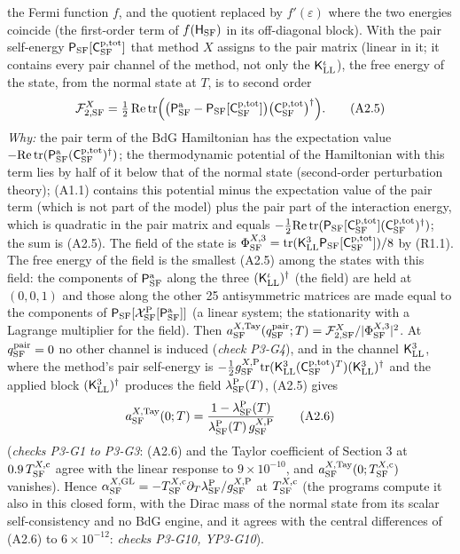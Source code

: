 \documentclass[
  10pt,
]{article}
\begin{document}
the Fermi function \(f\), and the quotient replaced by
\(f'(\varepsilon)\) where the two energies coincide (the first-order
term of \(f(\mathsf H_{\rm SF})\) in its off-diagonal block). With the
pair self-energy \(\mathsf P_{\rm SF}[\mathsf C^{\rm p,tot}_{\rm SF}]\)
that method \(X\) assigns to the pair matrix (linear in it; it contains
every pair channel of the method, not only the
\(\mathsf K^\iota_{\rm LL}\)), the free energy of the state, from the
normal state at \(T\), is to second order
\[\mathcal F^X_{2,{\rm SF}}=\tfrac12\,\mathrm{Re}\,\mathrm{tr}\Big(\big(\mathsf P^{\rm a}_{\rm SF}-\mathsf P_{\rm SF}[\mathsf C^{\rm p,tot}_{\rm SF}]\big)\big(\mathsf C^{\rm p,tot}_{\rm SF}\big)^\dagger\Big).\tag{A2.5}\]
\emph{Why:} the pair term of the BdG Hamiltonian has the expectation
value
\(-\mathrm{Re}\,\mathrm{tr}(\mathsf P^{\rm a}_{\rm SF}(\mathsf C^{\rm p,tot}_{\rm SF})^\dagger)\);
the thermodynamic potential of the Hamiltonian with this term lies by
half of it below that of the normal state (second-order perturbation
theory); (A1.1) contains this potential minus the expectation value of
the pair term (which is not part of the model) plus the pair part of the
interaction energy, which is quadratic in the pair matrix and equals
\(-\tfrac12\mathrm{Re}\,\mathrm{tr}(\mathsf P_{\rm SF}[\mathsf C^{\rm p,tot}_{\rm SF}](\mathsf C^{\rm p,tot}_{\rm SF})^\dagger)\);
the sum is (A2.5). The field of the state is
\(\Phi^{X,3}_{\rm SF}=\mathrm{tr}(\mathsf K^3_{\rm LL}\mathsf P_{\rm SF}[\mathsf C^{\rm p,tot}_{\rm SF}])/8\)
by (R1.1). The free energy of the field is the smallest (A2.5) among the
states with this field: the components of \(\mathsf P^{\rm a}_{\rm SF}\)
along the three \((\mathsf K^\iota_{\rm LL})^\dagger\) (the field) are
held at \((0,0,1)\) and those along the other 25 antisymmetric matrices
are made equal to the components of
\(\mathsf P_{\rm SF}[\mathcal X^{\rm P}_{\rm SF}[\mathsf P^{\rm a}_{\rm SF}]]\)
(a linear system; the stationarity with a Lagrange multiplier for the
field). Then
\(a^{X,{\rm Tay}}_{\rm SF}(q^{\rm pair}_{\rm SF};T)=\mathcal F^X_{2,{\rm SF}}/\lvert\Phi^{X,3}_{\rm SF}\rvert^2\).
At \(q^{\rm pair}_{\rm SF}=0\) no other channel is induced (\emph{check
P3-G4}), and in the channel \(\mathsf K^3_{\rm LL}\), where the method's
pair self-energy is
\(-\tfrac12g^{X,{\rm P}}_{\rm SF}\mathrm{tr}(\mathsf K^3_{\rm LL}(\mathsf C^{\rm p,tot}_{\rm SF})^T)(\mathsf K^3_{\rm LL})^\dagger\)
and the applied block \((\mathsf K^3_{\rm LL})^\dagger\) produces the
field \(\lambda^{\rm P}_{\rm SF}(T)\), (A2.5) gives
\[a^{X,{\rm Tay}}_{\rm SF}(0;T)=\frac{1-\lambda^{\rm P}_{\rm SF}(T)}{\lambda^{\rm P}_{\rm SF}(T)\,g^{X,{\rm P}}_{\rm SF}}\tag{A2.6}\]
(\emph{checks P3-G1 to P3-G3}: (A2.6) and the Taylor coefficient of
Section 3 at \(0.9\,T^{X,{\rm c}}_{\rm SF}\) agree with the linear
response to \(9\times10^{-10}\), and
\(a^{X,{\rm Tay}}_{\rm SF}(0;T^{X,{\rm c}}_{\rm SF})\) vanishes). Hence
\(\alpha^{X,{\rm GL}}_{\rm SF}=-T^{X,{\rm c}}_{\rm SF}\partial_T\lambda^{\rm P}_{\rm SF}/g^{X,{\rm P}}_{\rm SF}\)
at \(T^{X,{\rm c}}_{\rm SF}\) (the programs compute it also in this
closed form, with the Dirac mass of the normal state from its scalar
self-consistency and no BdG engine, and it agrees with the central
differences of (A2.6) to \(6\times10^{-12}\): \emph{checks P3-G10,
YP3-G10}).
\end{document}
